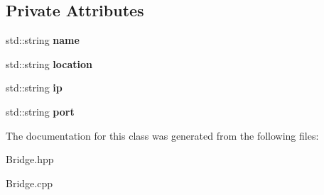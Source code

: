 \subsection*{Private Attributes}
\begin{DoxyCompactItemize}
\item 
\mbox{\label{class_bridge_ab637783a4122c0423c513dfc03b314f6}} 
std\+::string {\bfseries name}
\item 
\mbox{\label{class_bridge_a04f9fec6433cadffde5fda71a004af96}} 
std\+::string {\bfseries location}
\item 
\mbox{\label{class_bridge_a883ece1ead9aa95d8b8bbf5d44049d90}} 
std\+::string {\bfseries ip}
\item 
\mbox{\label{class_bridge_a68fbd2985367915e475d2c16884c9a30}} 
std\+::string {\bfseries port}
\end{DoxyCompactItemize}


The documentation for this class was generated from the following files\+:\begin{DoxyCompactItemize}
\item 
Bridge.\+hpp\item 
Bridge.\+cpp\end{DoxyCompactItemize}
